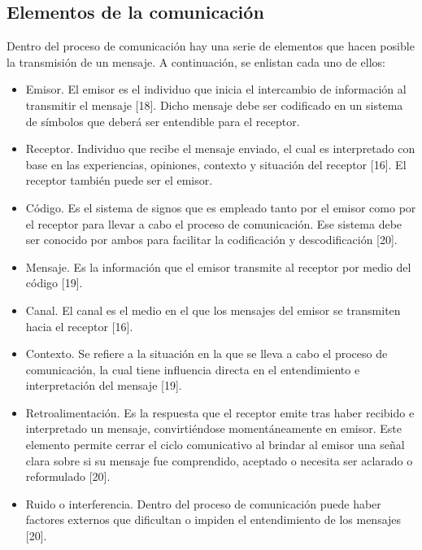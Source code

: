 \subsection{Elementos de la comunicación}
Dentro del proceso de comunicación hay una serie de elementos que hacen posible la transmisión de un mensaje. A continuación, se enlistan cada uno de ellos: 
\begin{itemize}
    
\item Emisor. El emisor es el individuo que inicia el intercambio de información al transmitir el mensaje [18]. Dicho mensaje debe ser codificado en un sistema de símbolos que deberá ser entendible para el receptor. 

\item Receptor. Individuo que recibe el mensaje enviado, el cual es interpretado con base en las experiencias, opiniones, contexto y situación del receptor [16]. El receptor también puede ser el emisor.

\item Código. Es el sistema de signos que es empleado tanto por el emisor como por el receptor para llevar a cabo el proceso de comunicación. Ese sistema debe ser conocido por ambos para facilitar la codificación y descodificación [20].

\item Mensaje. Es la información que el emisor transmite al receptor por medio del código [19].

\item Canal. El canal es el medio en el que los mensajes del emisor se transmiten hacia el receptor [16].

\item Contexto. Se refiere a la situación en la que se lleva a cabo el proceso de comunicación, la cual tiene influencia directa en el entendimiento e interpretación del mensaje [19].

\item Retroalimentación. Es la respuesta que el receptor emite tras haber recibido e interpretado un mensaje, convirtiéndose momentáneamente en emisor. Este elemento permite cerrar el ciclo comunicativo al brindar al emisor una señal clara sobre si su mensaje fue comprendido, aceptado o necesita ser aclarado o reformulado [20].

\item Ruido o interferencia. Dentro del proceso de comunicación puede haber factores externos que dificultan o impiden el entendimiento de los mensajes [20].
\end{itemize}

